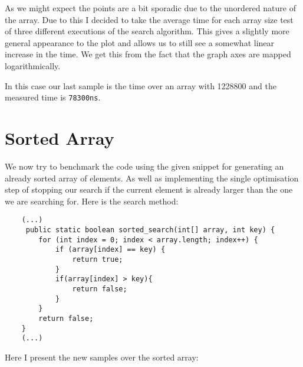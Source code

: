 \documentclass[a4paper,11pt]{article}
\begin{document}
As we might expect the points are a bit sporadic due to the unordered nature of the array. Due to this I decided to take the average time for each array size test of three different executions of the search algorithm. This gives a slightly more general appearance to the plot and allows us to still see a somewhat linear increase in the time. We get this from the fact that the graph axes are mapped logarithmically.

In this case our last sample is the time over an array with 1228800 and the measured time is {\tt 78300ns}.

\section*{Sorted Array}
We now try to benchmark the code using the given snippet for generating an already sorted array of elements. As well as implementing the single optimisation step of stopping our search if the current element is already larger than the one we are searching for. Here is the search method:


\begin{verbatim}
    (...)
     public static boolean sorted_search(int[] array, int key) {
        for (int index = 0; index < array.length; index++) {
            if (array[index] == key) {
                return true;
            }
            if(array[index] > key){
                return false;
            }
        }
        return false;
    }
    (...)
\end{verbatim}    

Here I present the new samples over the sorted array: 
\end{document}
